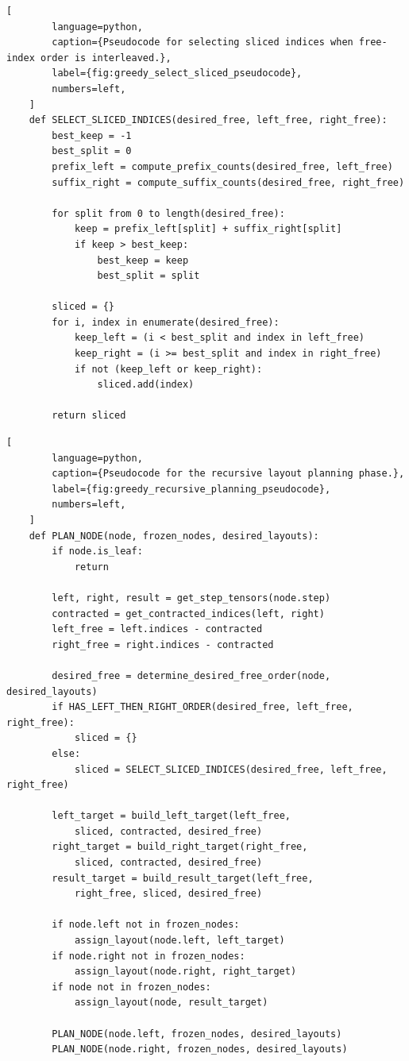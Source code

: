 \begin{center}
    \begin{lstlisting}[
        language=python,
        caption={Pseudocode for selecting sliced indices when free-index order is interleaved.},
        label={fig:greedy_select_sliced_pseudocode},
        numbers=left,
    ]
    def SELECT_SLICED_INDICES(desired_free, left_free, right_free):
        best_keep = -1
        best_split = 0
        prefix_left = compute_prefix_counts(desired_free, left_free)
        suffix_right = compute_suffix_counts(desired_free, right_free)

        for split from 0 to length(desired_free):
            keep = prefix_left[split] + suffix_right[split]
            if keep > best_keep:
                best_keep = keep
                best_split = split

        sliced = {}
        for i, index in enumerate(desired_free):
            keep_left = (i < best_split and index in left_free)
            keep_right = (i >= best_split and index in right_free)
            if not (keep_left or keep_right):
                sliced.add(index)

        return sliced
    \end{lstlisting}
\end{center}

\begin{center}
    \begin{lstlisting}[
        language=python,
        caption={Pseudocode for the recursive layout planning phase.},
        label={fig:greedy_recursive_planning_pseudocode},
        numbers=left,
    ]
    def PLAN_NODE(node, frozen_nodes, desired_layouts): 
        if node.is_leaf:
            return

        left, right, result = get_step_tensors(node.step)
        contracted = get_contracted_indices(left, right)
        left_free = left.indices - contracted
        right_free = right.indices - contracted

        desired_free = determine_desired_free_order(node, desired_layouts)
        if HAS_LEFT_THEN_RIGHT_ORDER(desired_free, left_free, right_free):
            sliced = {}
        else:
            sliced = SELECT_SLICED_INDICES(desired_free, left_free, right_free)

        left_target = build_left_target(left_free, 
            sliced, contracted, desired_free)
        right_target = build_right_target(right_free, 
            sliced, contracted, desired_free)
        result_target = build_result_target(left_free, 
            right_free, sliced, desired_free)

        if node.left not in frozen_nodes:
            assign_layout(node.left, left_target)
        if node.right not in frozen_nodes:
            assign_layout(node.right, right_target)
        if node not in frozen_nodes:
            assign_layout(node, result_target)

        PLAN_NODE(node.left, frozen_nodes, desired_layouts)
        PLAN_NODE(node.right, frozen_nodes, desired_layouts)
    \end{lstlisting}
\end{center}

